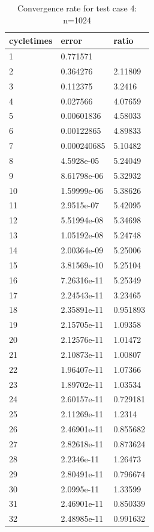 \documentclass[UTF8]{ctexart}
\theoremstyle{plain}
\theoremstyle{definition}
\theoremstyle{remark}
\begin{document}
\begin{table}[H]
\centering
\begin{tabular}{|l|l|l|}
\hline
cycletimes & error & ratio\\\hline
1 & 0.771571&\\ \hline
2 & 0.364276& 2.11809\\ \hline
3 & 0.112375& 3.2416\\ \hline
4 & 0.027566& 4.07659\\ \hline
5 & 0.00601836& 4.58033\\ \hline
6 & 0.00122865& 4.89833\\ \hline
7 & 0.000240685& 5.10482\\ \hline
8 & 4.5928e-05& 5.24049\\ \hline
9 & 8.61798e-06& 5.32932\\ \hline
10 & 1.59999e-06& 5.38626\\ \hline
11 & 2.9515e-07& 5.42095\\ \hline
12 & 5.51994e-08& 5.34698\\ \hline
13 & 1.05192e-08& 5.24748\\ \hline
14 & 2.00364e-09& 5.25006\\ \hline
15 & 3.81569e-10& 5.25104\\ \hline
16 & 7.26316e-11& 5.25349\\ \hline
17 & 2.24543e-11& 3.23465\\ \hline
18 & 2.35891e-11& 0.951893\\ \hline
19 & 2.15705e-11& 1.09358\\ \hline
20 & 2.12576e-11& 1.01472\\ \hline
21 & 2.10873e-11& 1.00807\\ \hline
22 & 1.96407e-11& 1.07366\\ \hline
23 & 1.89702e-11& 1.03534\\ \hline
24 & 2.60157e-11& 0.729181\\ \hline
25 & 2.11269e-11& 1.2314\\ \hline
26 & 2.46901e-11& 0.855682\\ \hline
27 & 2.82618e-11& 0.873624\\ \hline
28 & 2.2346e-11& 1.26473\\ \hline
29 & 2.80491e-11& 0.796674\\ \hline
30 & 2.0995e-11& 1.33599\\ \hline
31 & 2.46901e-11& 0.850339\\ \hline
32 & 2.48985e-11& 0.991632\\ \hline
\end{tabular}
\caption{Convergence rate for test case 4: n=1024}
\end{table}
\end{document}
